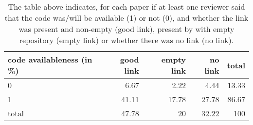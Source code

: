 \documentclass{article}
\begin{document}
\begin{table}[H]

\centering

\begin{tabular}{lrrrr}
\hline
 code availableness (in \%)   &   good link &   empty link &   no link &   total \\
\hline
 0                           &        6.67 &         2.22 &      4.44 &   13.33 \\
 1                           &       41.11 &        17.78 &     27.78 &   86.67 \\
 total                       &       47.78 &        20    &     32.22 &  100    \\
\hline
\end{tabular}\caption{The table above indicates, for each paper if at least one reviewer said that the 
 code was/will be available (1) or not (0), and whether the link was present and non-empty (good link), 
 present by with empty repository (empty link) or whether there was no link (no link).}

\end{table}
\end{document}
